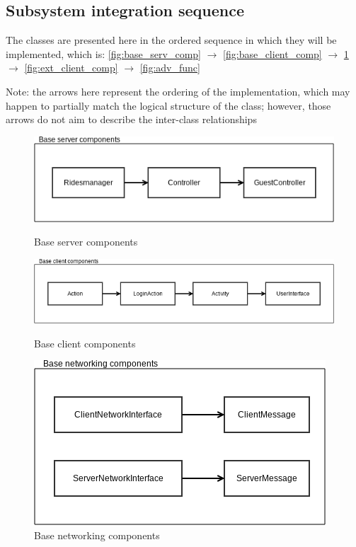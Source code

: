 \subsection{Subsystem integration sequence}
The classes are presented here in the ordered sequence in which they will be implemented, which is:
\ref{fig:base_serv_comp} $\rightarrow$ \ref{fig:base_client_comp} $\rightarrow$ \ref{fig:base_net_comp}
 $\rightarrow$ \ref{fig:ext_client_comp} $\rightarrow$ \ref{fig:adv_func}

Note: the arrows here represent the ordering of the implementation, which may happen to partially
match the logical structure of the class; however, those arrows do not aim to describe the inter-class
relationships

\begin{figure} [h]
  \centering
  \includegraphics[scale=0.72]{diagrams/point 1.png}
  \caption{\label{fig:base_serv_comp} Base server components}
  \vspace{3mm}
  \includegraphics[scale=0.6]{diagrams/point 2.png}
  \caption{\label{fig:base_client_comp} Base client components}
  \vspace{3mm}
  \includegraphics[scale=0.72]{diagrams/point 3.png}
  \caption{\label{fig:base_net_comp} Base networking components}

\end{figure}

